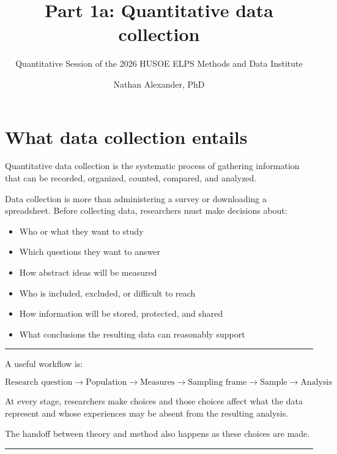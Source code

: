 \documentclass[
  letterpaper,
  DIV=11,
  numbers=noendperiod]{scrartcl}
\title{Part 1a: Quantitative data collection}
\subtitle{Quantitative Session of the 2026 HUSOE ELPS Methods and Data
Institute}
\author{Nathan Alexander, PhD}
\date{}
\providecommand{\tightlist}{%
  \setlength{\itemsep}{0pt}\setlength{\parskip}{0pt}}\usepackage{longtable,booktabs,array}
\renewcommand*\contentsname{Table of contents}
\newcommand\contentsname{Table of contents}
\begin{document}
\maketitle

\renewcommand*\contentsname{Table of contents}
{
\hypersetup{linkcolor=}
\setcounter{tocdepth}{3}
\tableofcontents
}

\section{What data collection
entails}\label{what-data-collection-entails}

Quantitative data collection is the systematic process of gathering
information that can be recorded, organized, counted, compared, and
analyzed.

Data collection is more than administering a survey or downloading a
spreadsheet. Before collecting data, researchers must make decisions
about:

\begin{itemize}
\tightlist
\item
  Who or what they want to study
\item
  Which questions they want to answer
\item
  How abstract ideas will be measured
\item
  Who is included, excluded, or difficult to reach
\item
  How information will be stored, protected, and shared
\item
  What conclusions the resulting data can reasonably support
\end{itemize}

\begin{center}\rule{0.5\linewidth}{0.5pt}\end{center}

A useful workflow is:

\[
\text{Research question} \rightarrow \text{Population} \rightarrow \text{Measures} \rightarrow \text{Sampling frame} \rightarrow \text{Sample} \rightarrow \text{Analysis}
\]

At every stage, researchers make choices and those choices affect what
the data represent and whose experiences may be absent from the
resulting analysis.

The handoff between theory and method also happens as these choices are
made.

\begin{center}\rule{0.5\linewidth}{0.5pt}\end{center}
\end{document}
